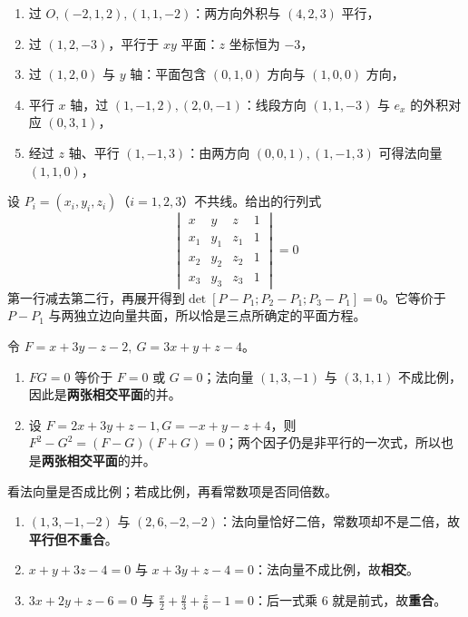 \begin{enumerate}[label=(\arabic*)]
\item 过 $O,( -2,1,2),(1,1,-2)$：两方向外积与 $(4,2,3)$ 平行，
\item 过 $(1,2,-3)$，平行于 $xy$ 平面：$z$ 坐标恒为 $-3$，
\item 过 $(1,2,0)$ 与 $y$ 轴：平面包含 $(0,1,0)$ 方向与 $(1,0,0)$ 方向，
\item 平行 $x$ 轴，过 $(1,-1,2),(2,0,-1)$：线段方向 $(1,1,-3)$ 与 $e_x$ 的外积对应 $(0,3,1)$，
\item 经过 $z$ 轴、平行 $(1,-1,3)$：由两方向 $(0,0,1),(1,-1,3)$ 可得法向量 $(1,1,0)$，
\end{enumerate}

设 $P_i=(x_i,y_i,z_i)$（$i=1,2,3$）不共线。给出的行列式
\[
\begin{vmatrix}x&y&z&1\\x_1&y_1&z_1&1\\x_2&y_2&z_2&1\\x_3&y_3&z_3&1\end{vmatrix}=0
\]
第一行减去第二行，再展开得到\(\det[P-P_1;P_2-P_1;P_3-P_1]=0\)。它等价于 $P-P_1$ 与两独立边向量共面，所以恰是三点所确定的平面方程。

令 $F=x+3y-z-2,\ G=3x+y+z-4$。
\begin{enumerate}[label=(\arabic*)]
\item $FG=0$ 等价于 $F=0$ 或 $G=0$；法向量 $(1,3,-1)$ 与 $(3,1,1)$ 不成比例，因此是\textbf{两张相交平面}的并。
\item 设 $F=2x+3y+z-1,G=-x+y-z+4$，则 $F^2-G^2=(F-G)(F+G)=0$；两个因子仍是非平行的一次式，所以也是\textbf{两张相交平面}的并。
\end{enumerate}

看法向量是否成比例；若成比例，再看常数项是否同倍数。
\begin{enumerate}[label=(\arabic*)]
\item $(1,3,-1,-2)$ 与 $(2,6,-2,-2)$：法向量恰好二倍，常数项却不是二倍，故\textbf{平行但不重合}。
\item $x+y+3z-4=0$ 与 $x+3y+z-4=0$：法向量不成比例，故\textbf{相交}。
\item $3x+2y+z-6=0$ 与 $\frac x2+\frac y3+\frac z6-1=0$：后一式乘 $6$ 就是前式，故\textbf{重合}。
\end{enumerate}

